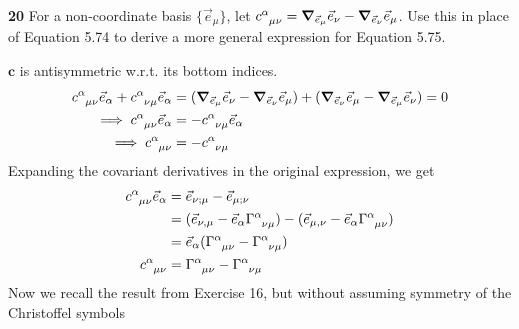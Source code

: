 \documentclass[gr-notes.tex]{subfiles}
\begin{document}
\textbf{20}
For a non-coordinate basis $\{ \vec{e}_\mu \}$, let $\tensor{c}{^\alpha_{\mu\nu}} = \grad_{\vec{e}_\mu} \vec{e}_\nu - \grad_{\vec{e}_\nu} \vec{e}_\mu$. Use this in place of Equation 5.74 to derive a more general expression for Equation 5.75.

$\boldsymbol{c}$ is antisymmetric w.r.t. its bottom indices.
%
\begin{align*}
  \tensor{c}{^\alpha_{\mu\nu}} \vec{e}_\alpha +
  \tensor{c}{^\alpha_{\nu\mu}} \vec{e}_\alpha &=
  (\grad_{\vec{e}_\mu} \vec{e}_\nu - \grad_{\vec{e}_\nu} \vec{e}_\mu) +
  (\grad_{\vec{e}_\nu} \vec{e}_\mu - \grad_{\vec{e}_\mu} \vec{e}_\nu) =
  0
  \\ \implies
   \tensor{c}{^\alpha_{\mu\nu}} \vec{e}_\alpha &=
  -\tensor{c}{^\alpha_{\nu\mu}} \vec{e}_\alpha
  \\ \implies
   \tensor{c}{^\alpha_{\mu\nu}} &=
  -\tensor{c}{^\alpha_{\nu\mu}}
\end{align*}
%
Expanding the covariant derivatives in the original expression, we get
\begin{align*}
  \tensor{c}{^\alpha_{\mu\nu}} \vec{e}_\alpha &=
  \vec{e}_{\nu;\mu} - \vec{e}_{\mu;\nu}
  \\ &=
  (\vec{e}_{\nu,\mu} - \vec{e}_\alpha \tensor{\Gamma}{^\alpha_{\nu\mu}}) -
  (\vec{e}_{\mu,\nu} - \vec{e}_\alpha \tensor{\Gamma}{^\alpha_{\mu\nu}})
  \\ &=
  \vec{e}_\alpha
  (\tensor{\Gamma}{^\alpha_{\mu\nu}} - \tensor{\Gamma}{^\alpha_{\nu\mu}})
  \\
  \tensor{c}{^\alpha_{\mu\nu}} &=
  \tensor{\Gamma}{^\alpha_{\mu\nu}} - \tensor{\Gamma}{^\alpha_{\nu\mu}}
\end{align*}
%
Now we recall the result from Exercise 16, but without assuming symmetry of the Christoffel symbols
%
\end{document}
